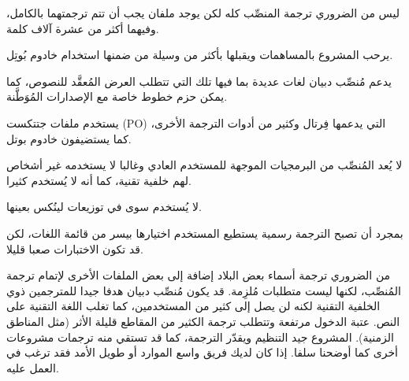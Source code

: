 \startitemize[1]
\item ليس من الضروري ترجمة المنصِّب كله لكن يوجد ملفان يجب أن تتم
ترجمتهما بالكامل، وفيهما أكثر من عشرة آلاف كلمة.
\item يرحب المشروع بالمساهمات ويقبلها بأكثر من وسيلة من ضمنها استخدام
خادوم بُوتِل.
\item يدعم مُنصِّب دبيان لغات عديدة بما فيها تلك التي تتطلب العرض
المُعقَّد للنصوص، كما يمكن حزم خطوط خاصة مع الإصدارات المُوَطَّنة.
\item يستخدم ملفات جتتكست (PO) التي يدعمها فِرتال وكثير من أدوات الترجمة
الأخرى، كما يستضيفون خادوم بوتل.
\item لا يُعد المُنصِّب من البرمجيات الموجهة للمستخدم العادي وغالبا لا
يستخدمه غير أشخاص لهم خلفية تقنية، كما أنه لا يُستخدم كثيرا.
\item لا يُستخدم سوى في توزيعات لينُكس بعينها.
\item بمجرد أن تصبح الترجمة رسمية يستطيع المستخدم اختيارها بيسر من قائمة
اللغات، لكن قد تكون الاختبارات صعبا قليلا.
\item من الضروري ترجمة أسماء بعض البلاد إضافة إلى بعض الملفات الأخرى
لإتمام ترجمة المُنصِّب، لكنها ليست متطلبات مُلزِمة.
\stopitemize
قد يكون مُنصِّب دبيان هدفا جيدا للمترجمين ذوي الخلفية التقنية لكنه لن
يصل إلى كثير من المستخدمين، كما تغلب اللغة التقنية على النص. عتبة
الدخول مرتفعة وتتطلب ترجمة الكثير من المقاطع قليلة الأثر (مثل المناطق
الزمنية). المشروع جيد التنظيم ويقدّر الترجمة، كما قد تستقي منه ترجمات
مشروعات أخرى كما أوضحنا سلفا. إذا كان لديك فريق واسع الموارد أو طويل
الأمد فقد ترغب في العمل عليه.

